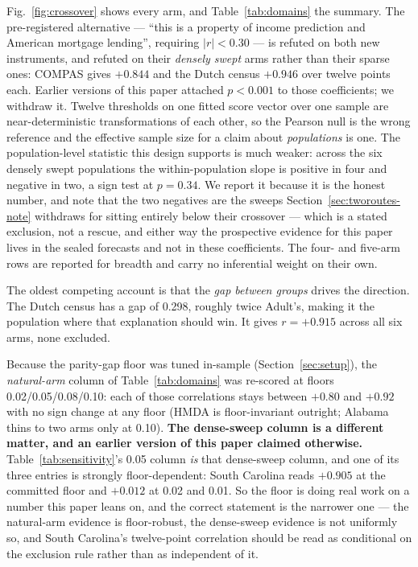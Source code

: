 \documentclass[9pt,conference]{IEEEtran}
\begin{document}
Fig.~\ref{fig:crossover} shows every arm, and Table~\ref{tab:domains} the summary. The
pre-registered alternative --- ``this is a property of income prediction and American mortgage
lending'', requiring $|r| < 0.30$ --- is refuted on both new instruments, and refuted on their \emph{densely swept} arms rather than their sparse ones: COMPAS gives
$+0.844$ and the Dutch census $+0.946$ over twelve points each. Earlier versions of this paper
attached $p < 0.001$ to those coefficients; we withdraw it. Twelve thresholds on one fitted
score vector over one sample are near-deterministic transformations of each other, so the
Pearson null is the wrong reference and the effective sample size for a claim about
\emph{populations} is one. The population-level statistic this design supports is much
weaker: across the six densely swept populations the within-population slope is positive in
four and negative in two, a sign test at $p = 0.34$. We report it because it is the honest
number, and note that the two negatives are the sweeps Section~\ref{sec:tworoutes-note}
withdraws for sitting entirely below their crossover --- which is a stated exclusion, not a
rescue, and either way the prospective evidence for this paper lives in the sealed forecasts
and not in these coefficients. The four- and five-arm rows are reported for breadth and carry
no inferential weight on their own.

The oldest competing account is that the \emph{gap between groups} drives the direction. The
Dutch census has a gap of 0.298, roughly twice Adult's, making it the population where that
explanation should win. It gives $r = +0.915$ across all six arms, none excluded.

Because the parity-gap floor was tuned in-sample (Section~\ref{sec:setup}), the
\emph{natural-arm} column of Table~\ref{tab:domains} was re-scored at floors
0.02/0.05/0.08/0.10: each of those correlations stays between $+0.80$ and $+0.92$ with no sign
change at any floor (HMDA is floor-invariant outright; Alabama thins to two arms only at
0.10). \textbf{The dense-sweep column is a different matter, and an earlier version of this
paper claimed otherwise.} Table~\ref{tab:sensitivity}'s 0.05 column \emph{is} that dense-sweep
column, and one of its three entries is strongly floor-dependent: South Carolina reads
$+0.905$ at the committed floor and $+0.012$ at 0.02 and 0.01. So the floor is doing real work
on a number this paper leans on, and the correct statement is the narrower one --- the
natural-arm evidence is floor-robust, the dense-sweep evidence is not uniformly so, and South
Carolina's twelve-point correlation should be read as conditional on the exclusion rule rather
than as independent of it.
\end{document}
